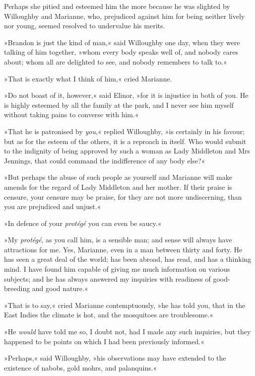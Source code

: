 Perhaps she pitied and esteemed him the more because he was slighted by Willoughby and Marianne, who, prejudiced against him for being neither lively nor young, seemed resolved to undervalue his merits.

»Brandon is just the kind of man,« said Willoughby one day, when they were talking of him together, »whom every body speaks well of, and nobody cares about; whom all are delighted to see, and nobody remembers to talk to.«

»That is exactly what I think of him,« cried Marianne.

»Do not boast of it, however,« said Elinor, »for it is injustice in both of you. He is highly esteemed by all the family at the park, and I never see him myself without taking pains to converse with him.«

»That he is patronised by \textit{you},« replied Willoughby, »is certainly in his favour; but as for the esteem of the others, it is a reproach in itself. Who would submit to the indignity of being approved by such a woman as Lady Middleton and Mrs Jennings, that could command the indifference of any body else?«

»But perhaps the abuse of such people as yourself and Marianne will make amends for the regard of Lady Middleton and her mother. If their praise is censure, your censure may be praise, for they are not more undiscerning, than you are prejudiced and unjust.«

»In defence of your \textit{protégé} you can even be saucy.«

»My \textit{protégé}, as you call him, is a sensible man; and sense will always have attractions for me. Yes, Marianne, even in a man between thirty and forty. He has seen a great deal of the world; has been abroad, has read, and has a thinking mind. I have found him capable of giving me much information on various subjects; and he has always answered my inquiries with readiness of good-breeding and good nature.«

»That is to say,« cried Marianne contemptuously, »he has told you, that in the East Indies the climate is hot, and the mosquitoes are troublesome.«

»He \textit{would} have told me so, I doubt not, had I made any such inquiries, but they happened to be points on which I had been previously informed.«

»Perhaps,« said Willoughby, »his observations may have extended to the existence of nabobs, gold mohrs, and palanquins.«

